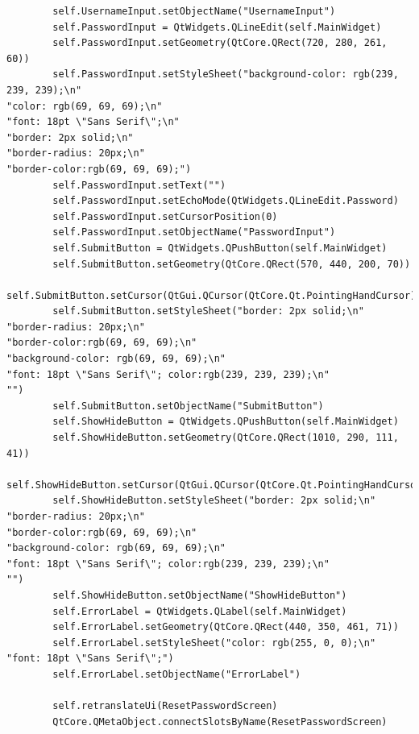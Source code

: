 \documentclass[12pt]{article}
\begin{document}
\begin{lstlisting}
        self.UsernameInput.setObjectName("UsernameInput")
        self.PasswordInput = QtWidgets.QLineEdit(self.MainWidget)
        self.PasswordInput.setGeometry(QtCore.QRect(720, 280, 261, 60))
        self.PasswordInput.setStyleSheet("background-color: rgb(239, 239, 239);\n"
"color: rgb(69, 69, 69);\n"
"font: 18pt \"Sans Serif\";\n"
"border: 2px solid;\n"
"border-radius: 20px;\n"
"border-color:rgb(69, 69, 69);")
        self.PasswordInput.setText("")
        self.PasswordInput.setEchoMode(QtWidgets.QLineEdit.Password)
        self.PasswordInput.setCursorPosition(0)
        self.PasswordInput.setObjectName("PasswordInput")
        self.SubmitButton = QtWidgets.QPushButton(self.MainWidget)
        self.SubmitButton.setGeometry(QtCore.QRect(570, 440, 200, 70))
        self.SubmitButton.setCursor(QtGui.QCursor(QtCore.Qt.PointingHandCursor))
        self.SubmitButton.setStyleSheet("border: 2px solid;\n"
"border-radius: 20px;\n"
"border-color:rgb(69, 69, 69);\n"
"background-color: rgb(69, 69, 69);\n"
"font: 18pt \"Sans Serif\"; color:rgb(239, 239, 239);\n"
"")
        self.SubmitButton.setObjectName("SubmitButton")
        self.ShowHideButton = QtWidgets.QPushButton(self.MainWidget)
        self.ShowHideButton.setGeometry(QtCore.QRect(1010, 290, 111, 41))
        self.ShowHideButton.setCursor(QtGui.QCursor(QtCore.Qt.PointingHandCursor))
        self.ShowHideButton.setStyleSheet("border: 2px solid;\n"
"border-radius: 20px;\n"
"border-color:rgb(69, 69, 69);\n"
"background-color: rgb(69, 69, 69);\n"
"font: 18pt \"Sans Serif\"; color:rgb(239, 239, 239);\n"
"")
        self.ShowHideButton.setObjectName("ShowHideButton")
        self.ErrorLabel = QtWidgets.QLabel(self.MainWidget)
        self.ErrorLabel.setGeometry(QtCore.QRect(440, 350, 461, 71))
        self.ErrorLabel.setStyleSheet("color: rgb(255, 0, 0);\n"
"font: 18pt \"Sans Serif\";")
        self.ErrorLabel.setObjectName("ErrorLabel")

        self.retranslateUi(ResetPasswordScreen)
        QtCore.QMetaObject.connectSlotsByName(ResetPasswordScreen)


\end{lstlisting}
\end{document}
